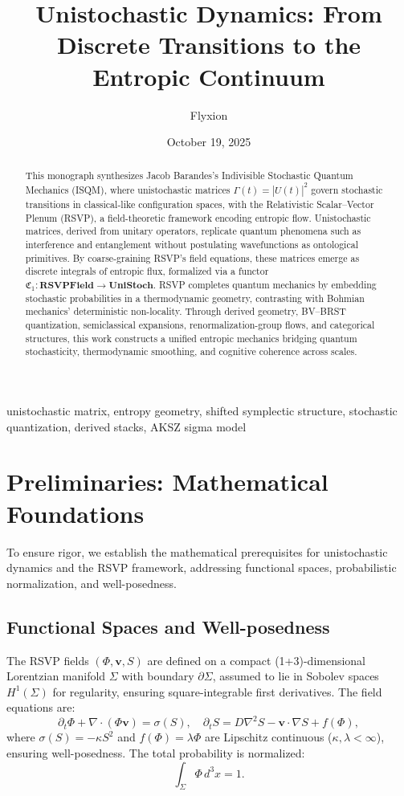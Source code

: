 \documentclass[12pt]{article}
\title{\textbf{Unistochastic Dynamics: From Discrete Transitions to the Entropic Continuum}}
\author{Flyxion}
\date{October 19, 2025}
\begin{document}
\maketitle

\begin{abstract}
This monograph synthesizes Jacob Barandes’s Indivisible Stochastic Quantum Mechanics (ISQM), where unistochastic matrices \(\Gamma(t) = |U(t)|^2\) govern stochastic transitions in classical-like configuration spaces, with the Relativistic Scalar–Vector Plenum (RSVP), a field-theoretic framework encoding entropic flow. Unistochastic matrices, derived from unitary operators, replicate quantum phenomena such as interference and entanglement without postulating wavefunctions as ontological primitives. By coarse-graining RSVP’s field equations, these matrices emerge as discrete integrals of entropic flux, formalized via a functor \(\mathfrak{C}_1: \mathbf{RSVPField} \to \mathbf{UniStoch}\). RSVP completes quantum mechanics by embedding stochastic probabilities in a thermodynamic geometry, contrasting with Bohmian mechanics’ deterministic non-locality. Through derived geometry, BV–BRST quantization, semiclassical expansions, renormalization-group flows, and categorical structures, this work constructs a unified entropic mechanics bridging quantum stochasticity, thermodynamic smoothing, and cognitive coherence across scales.
\end{abstract}

\begin{keywords}
unistochastic matrix, entropy geometry, shifted symplectic structure, stochastic quantization, derived stacks, AKSZ sigma model
\end{keywords}

\newpage
\tableofcontents
\newpage

\section{Preliminaries: Mathematical Foundations}

To ensure rigor, we establish the mathematical prerequisites for unistochastic dynamics and the RSVP framework, addressing functional spaces, probabilistic normalization, and well-posedness.

\subsection{Functional Spaces and Well-posedness}

The RSVP fields \((\Phi, \mathbf{v}, S)\) are defined on a compact (1+3)-dimensional Lorentzian manifold \(\Sigma\) with boundary \(\partial \Sigma\), assumed to lie in Sobolev spaces \(H^1(\Sigma)\) for regularity, ensuring square-integrable first derivatives. The field equations are:
\[
\partial_t \Phi + \nabla \cdot (\Phi \mathbf{v}) = \sigma(S), \quad \partial_t S = D \nabla^2 S - \mathbf{v} \cdot \nabla S + f(\Phi),
\]
where \(\sigma(S) = -\kappa S^2\) and \(f(\Phi) = \lambda \Phi\) are Lipschitz continuous (\(\kappa, \lambda < \infty\)), ensuring well-posedness. The total probability is normalized:
\[
\int_\Sigma \Phi \, d^3x = 1.
\]
\end{document}
